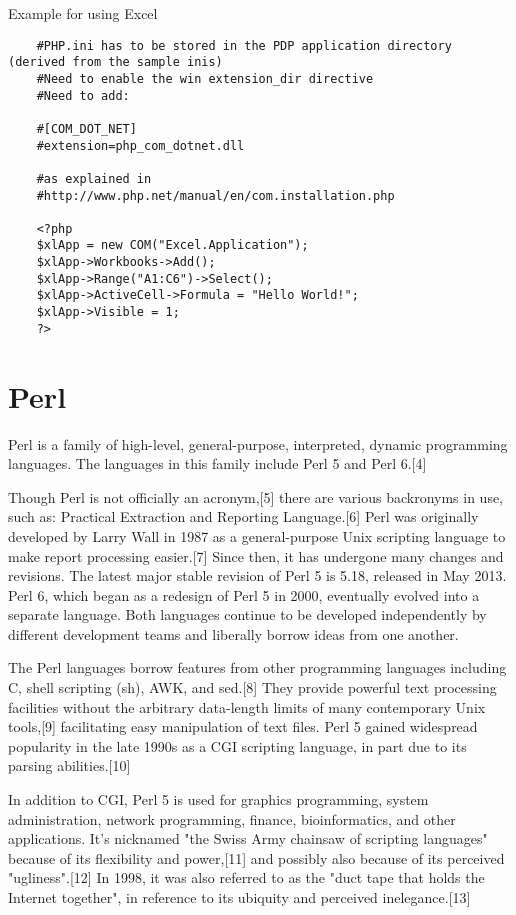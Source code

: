 	
	\vpara
	Example for using Excel
	
	\begin{lstlisting}
	#PHP.ini has to be stored in the PDP application directory (derived from the sample inis)
	#Need to enable the win extension_dir directive
	#Need to add:
	
	#[COM_DOT_NET]
	#extension=php_com_dotnet.dll
	
	#as explained in 
	#http://www.php.net/manual/en/com.installation.php
	
	<?php
	$xlApp = new COM("Excel.Application");
	$xlApp->Workbooks->Add();
	$xlApp->Range("A1:C6")->Select();
	$xlApp->ActiveCell->Formula = "Hello World!";
	$xlApp->Visible = 1;
	?>
	\end{lstlisting}
	
	
	
	
	\newpage
	\section{Perl}
	Perl is a family of high-level, general-purpose, interpreted, dynamic programming languages. The languages in this family include Perl 5 and Perl 6.[4]
	
	\vpara
	Though Perl is not officially an acronym,[5] there are various backronyms in use, such as: Practical Extraction and Reporting Language.[6] Perl was originally developed by Larry Wall in 1987 as a general-purpose Unix scripting language to make report processing easier.[7] Since then, it has undergone many changes and revisions. The latest major stable revision of Perl 5 is 5.18, released in May 2013. Perl 6, which began as a redesign of Perl 5 in 2000, eventually evolved into a separate language. Both languages continue to be developed independently by different development teams and liberally borrow ideas from one another.
	
	\vpara
	The Perl languages borrow features from other programming languages including C, shell scripting (sh), AWK, and sed.[8] They provide powerful text processing facilities without the arbitrary data-length limits of many contemporary Unix tools,[9] facilitating easy manipulation of text files. Perl 5 gained widespread popularity in the late 1990s as a CGI scripting language, in part due to its parsing abilities.[10]
	
	\vpara
	In addition to CGI, Perl 5 is used for graphics programming, system administration, network programming, finance, bioinformatics, and other applications. It's nicknamed "the Swiss Army chainsaw of scripting languages" because of its flexibility and power,[11] and possibly also because of its perceived "ugliness".[12] In 1998, it was also referred to as the "duct tape that holds the Internet together", in reference to its ubiquity and perceived inelegance.[13]
	
